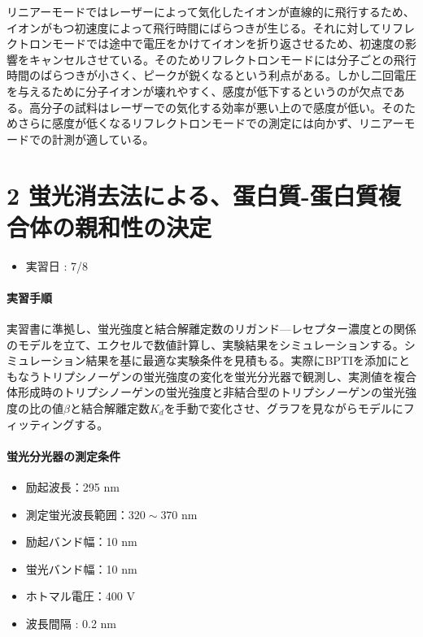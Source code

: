 \documentclass[a4paper,papersize,dvipdfmx]{jsarticle}
\begin{document}
リニアーモードではレーザーによって気化したイオンが直線的に飛行するため、イオンがもつ初速度によって飛行時間にばらつきが生じる。それに対してリフレクトロンモードでは途中で電圧をかけてイオンを折り返させるため、初速度の影響をキャンセルさせている。そのためリフレクトロンモードには分子ごとの飛行時間のばらつきが小さく、ピークが鋭くなるという利点がある。しかし二回電圧を与えるために分子イオンが壊れやすく、感度が低下するというのが欠点である。高分子の試料はレーザーでの気化する効率が悪い上ので感度が低い。そのためさらに感度が低くなるリフレクトロンモードでの測定には向かず、リニアーモードでの計測が適している。

\newpage


\part*{2 蛍光消去法による、蛋白質-蛋白質複合体の親和性の決定}

\begin{itemize}
\item 実習日 : 7/8

\end{itemize}
\subsection*{実習手順}

実習書に準拠し、蛍光強度と結合解離定数のリガンド—レセプター濃度との関係のモデルを立て、エクセルで数値計算し、実験結果をシミュレーションする。シミュレーション結果を基に最適な実験条件を見積もる。実際にBPTIを添加にともなうトリプシノーゲンの蛍光強度の変化を蛍光分光器で観測し、実測値を複合体形成時のトリプシノーゲンの蛍光強度と非結合型のトリプシノーゲンの蛍光強度の比の値$\beta$と結合解離定数$K_d$を手動で変化させ、グラフを見ながらモデルにフィッティングする。

\subsection*{蛍光分光器の測定条件}
\begin{itemize}
\item 励起波長：295 nm
\item 測定蛍光波長範囲：$320 \sim 370$ nm
\item 励起バンド幅：10 nm
\item 蛍光バンド幅：10 nm
\item ホトマル電圧：400 V
\item 波長間隔 : 0.2 nm

\end{itemize}
\end{document}
